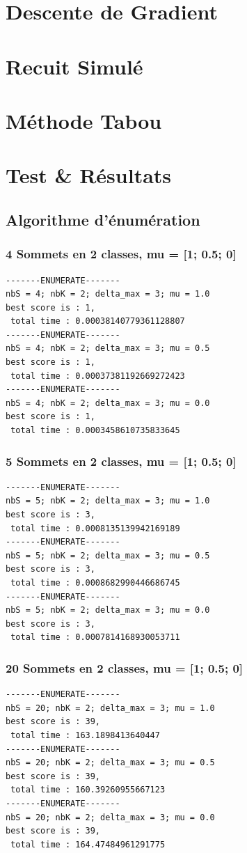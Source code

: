 \documentclass[a4paper]{article}
\begin{document}
\section{Descente de Gradient}

\section{Recuit Simulé}

\section{Méthode Tabou}

\section{Test \& Résultats}

\subsection{Algorithme d'énumération}
\subsubsection{4 Sommets en 2 classes, mu = [1; 0.5; 0]}
\begin{verbatim}
-------ENUMERATE-------
nbS = 4; nbK = 2; delta_max = 3; mu = 1.0
best score is : 1,
 total time : 0.00038140779361128807
-------ENUMERATE-------
nbS = 4; nbK = 2; delta_max = 3; mu = 0.5
best score is : 1,
 total time : 0.00037381192669272423
-------ENUMERATE-------
nbS = 4; nbK = 2; delta_max = 3; mu = 0.0
best score is : 1,
 total time : 0.0003458610735833645
\end{verbatim}
\subsubsection{5 Sommets en 2 classes, mu = [1; 0.5; 0]}
\begin{verbatim}
-------ENUMERATE-------
nbS = 5; nbK = 2; delta_max = 3; mu = 1.0
best score is : 3,
 total time : 0.0008135139942169189
-------ENUMERATE-------
nbS = 5; nbK = 2; delta_max = 3; mu = 0.5
best score is : 3,
 total time : 0.0008682990446686745
-------ENUMERATE-------
nbS = 5; nbK = 2; delta_max = 3; mu = 0.0
best score is : 3,
 total time : 0.0007814168930053711
\end{verbatim}
\subsubsection{20 Sommets en 2 classes, mu = [1; 0.5; 0]}
\begin{verbatim}
-------ENUMERATE-------
nbS = 20; nbK = 2; delta_max = 3; mu = 1.0
best score is : 39,
 total time : 163.1898413640447
-------ENUMERATE-------
nbS = 20; nbK = 2; delta_max = 3; mu = 0.5
best score is : 39,
 total time : 160.39260955667123
-------ENUMERATE-------
nbS = 20; nbK = 2; delta_max = 3; mu = 0.0
best score is : 39,
 total time : 164.47484961291775
\end{verbatim}
\end{document}
